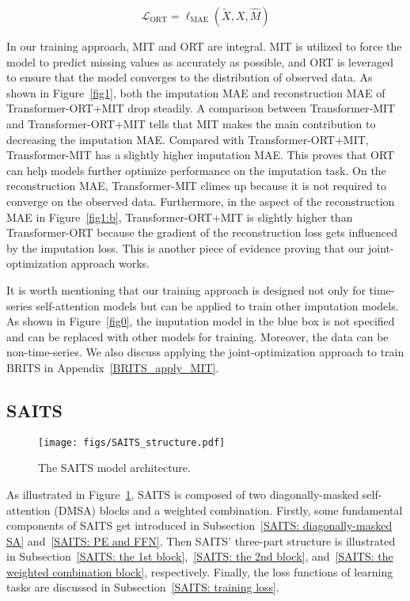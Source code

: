 \documentclass{article}
\begin{document}
\begin{equation}
	\label{reconstruction_loss_training}
	\mathcal{L}_\text{ORT} = \ell_{\text{MAE}}\left(\tilde{X}, X, \hat{M}\right)
\end{equation}

In our training approach, MIT and ORT are integral. MIT is utilized to force the model to predict missing values as accurately as possible, and ORT is leveraged to ensure that the model converges to the distribution of observed data. As shown in Figure~\ref{fig1}, both the imputation MAE and reconstruction MAE of Transformer-ORT+MIT drop steadily. A comparison between Transformer-MIT and Transformer-ORT+MIT tells that MIT makes the main contribution to decreasing the imputation MAE. Compared with Transformer-ORT+MIT, Transformer-MIT has a slightly higher imputation MAE. This proves that ORT can help models further optimize performance on the imputation task. On the reconstruction MAE, Transformer-MIT climes up because it is not required to converge on the observed data. Furthermore, in the aspect of the reconstruction MAE in Figure~\ref{fig1:b}, Transformer-ORT+MIT is slightly higher than Transformer-ORT because the gradient of the reconstruction loss gets influenced by the imputation loss. This is another piece of evidence proving that our joint-optimization approach works.

It is worth mentioning that our training approach is designed not only for time-series self-attention models but can be applied to train other imputation models. As shown in Figure~\ref{fig0}, the imputation model in the blue box is not specified and can be replaced with other models for training. Moreover, the data can be non-time-series. We also discuss applying the joint-optimization approach to train BRITS in Appendix~\ref{BRITS_apply_MIT}.

\subsection{SAITS} \label{methodology: SAITS}
\begin{figure}[!ht]
	\centering
	\texttt{[image: figs/SAITS\_structure.pdf]}
	\caption{The SAITS model architecture.}
	\label{fig:SAITS_structure}
\end{figure}

As illustrated in Figure~\ref{fig:SAITS_structure}, SAITS is composed of two diagonally-masked self-attention (DMSA) blocks and a weighted combination. Firstly, some fundamental components of SAITS get introduced in Subsection~\ref{SAITS: diagonally-masked SA} and~\ref{SAITS: PE and FFN}. Then SAITS' three-part structure is illustrated in Subsection~\ref{SAITS: the 1st block},~\ref{SAITS: the 2nd block}, and~\ref{SAITS: the weighted combination block}, respectively. Finally, the loss functions of learning tasks are discussed in Subsection~\ref{SAITS: training loss}.
\end{document}
